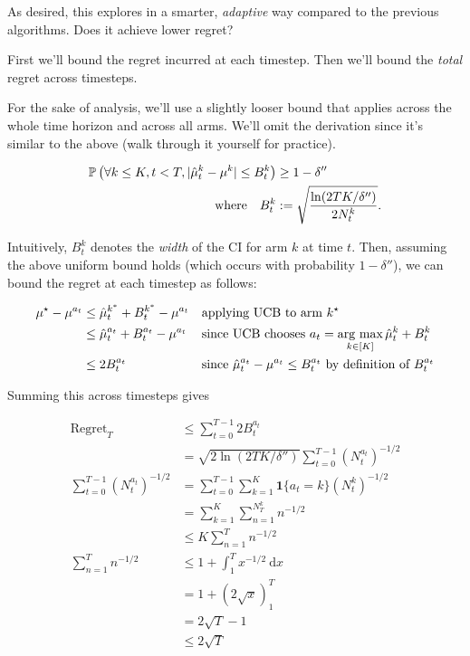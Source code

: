 \documentclass[\main/main]{subfiles}
\begin{document}
As desired, this explores in a smarter, \emph{adaptive} way compared to the previous algorithms. Does it achieve lower regret?

First we'll bound the regret incurred at each timestep. Then we'll bound the \emph{total} regret across timesteps.

For the sake of analysis, we'll use a slightly looser bound that applies across the whole time horizon and across all arms. We'll omit the derivation since it's similar to the above (walk through it yourself for practice).

\begin{align*}
    \P\left(\forall k \le K, t < T, |\hat \mu^k_t - \mu^k | \le B^k_t \right) &\ge 1-\delta'' \\
    \text{where} \quad B^k_t &:= \sqrt{\frac{\ln(2TK/\delta'')}{2N^k_t}}.
\end{align*}

Intuitively, $B^k_t$ denotes the \emph{width} of the CI for arm $k$ at time $t$. Then, assuming the above uniform bound holds (which occurs with probability $1-\delta''$), we can bound the regret at each timestep as follows:

\begin{align*}
    \mu^\star - \mu^{a_t} &\le \hat \mu^{k^*}_t + B_t^{k^*} - \mu^{a_t} && \text{applying UCB to arm } k^\star \\
    &\le \hat \mu^{a_t}_t + B^{a_t}_t - \mu^{a_t} && \text{since UCB chooses } a_t = \argmax_{k \in [K]} \hat \mu^k_t + B_t^{k} \\
    &\le 2 B^{a_t}_t && \text{since } \hat \mu^{a_t}_t - \mu^{a_t} \le B^{a_t}_t \text{ by definition of } B^{a_t}_t \\
\end{align*}

Summing this across timesteps gives

\begin{align*}
    \text{Regret}_T &\le \sum_{t=0}^{T-1} 2 B^{a_t}_t \\
    &= \sqrt{2\ln(2TK/\delta'')} \sum_{t=0}^{T-1} (N^{a_t}_t)^{-1/2} \\
    \sum_{t=0}^{T-1} (N^{a_t}_t)^{-1/2} &= \sum_{t=0}^{T-1} \sum_{k=1}^K \mathbf{1}\{ a_t = k \} (N^k_t)^{-1/2} \\
    &= \sum_{k=1}^K \sum_{n=1}^{N_T^k} n^{-1/2} \\
    &\le K \sum_{n=1}^T n^{-1/2} \\
    \sum_{n=1}^T n^{-1/2} &\le 1 + \int_1^T x^{-1/2} \ \mathrm{d}x \\
    &= 1 + (2 \sqrt{x})_1^T \\
    &= 2 \sqrt{T} - 1 \\
    &\le 2 \sqrt{T} \\
\end{align*}
\end{document}
